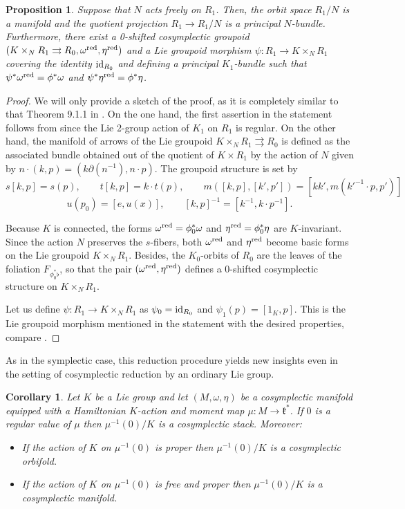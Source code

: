 \documentclass[
  a4paper, 
  reqno, 
  oneside, 
  12pt
]{amsart}
\newtheorem{proposition}[theorem]{Proposition}
\newtheorem{corollary}[theorem]{Corollary}
\theoremstyle{definition}
\theoremstyle{remark}
\newcommand{\rr}{\rightrightarrows}
\begin{document}
\begin{proposition}
Suppose that $N$ acts freely on $R_1$. Then, the orbit space $R_1/N$ is a  manifold and the quotient projection $R_1\to R_1/N$ is a principal $N$-bundle. Furthermore, there exist a 0-shifted cosymplectic groupoid $(K\times_NR_1\rr R_0,\omega^{\textnormal{red}},\eta^{\textnormal{red}})$	and a Lie groupoid morphism $\psi: R_1\to  K\times_NR_1$ covering the identity $\textnormal{id}_{R_0}$ and defining a principal $K_1$-bundle such that $\psi^\ast \omega^{\textnormal{red}}=\phi^\ast \omega$ and $\psi^\ast \eta^{\textnormal{red}}=\phi^\ast \eta$.
\end{proposition}
\begin{proof}
We will only provide a sketch of the proof, as it is completely similar to that Theorem 9.1.1 in \cite{HoffmanSjamaar}. On the one hand, the first assertion in the statement follows from \cite[Lem. 9.1.3]{HoffmanSjamaar} since the Lie 2-group action of $K_1$ on $R_1$ is regular. On the other hand, the manifold of arrows of the Lie groupoid $K\times_NR_1\rr R_0$ is defined as the associated bundle obtained out of the quotient of $K\times R_1$ by the action of $N$ given by $n\cdot (k,p)=(k\partial(n^{-1}),n\cdot p)$. The groupoid structure is set by  
$$s[k,p]=s(p),\qquad t[k,p]=k\cdot t(p),\qquad m([k,p],[k',p'])=[kk',m(k'^{-1}\cdot p,p')]$$
$$ u(p_0)=[e,u(x)], \qquad [k,p]^{-1}=[k^{-1},k\cdot p^{-1}].$$

Because $K$ is connected, the forms $\omega^{\textnormal{red}}=\phi_0^\ast \omega$ and $\eta^{\textnormal{red}}=\phi_0^\ast \eta$ are $K$-invariant. Since the action $N$ preserves the $s$-fibers, both $\omega^{\textnormal{red}}$ and $\eta^{\textnormal{red}}$ become basic forms on the Lie groupoid $K\times_N R_1$. Besides, the $K_0$-orbits of $R_0$ are the leaves of the foliation $F_{\phi_0^\ast \flat}$, so that the pair $(\omega^{\textnormal{red}},\eta^{\textnormal{red}})$ defines a 0-shifted cosymplectic structure on $K\times_N R_1$.

Let us define $\psi:R_1\to K\times_N R_1$ as $\psi_0=\textnormal{id}_{R_0}$ and $\psi_1(p)=[1_K,p]$. This is the Lie groupoid morphism mentioned in the statement with the desired properties, compare \cite[Prop. 9.1.4]{HoffmanSjamaar}.
\end{proof}

As in the symplectic case, this reduction procedure yields new insights even in the setting of cosymplectic reduction by an ordinary Lie group.

\begin{corollary}
Let $K$ be a Lie group and let $(M,\omega,\eta)$ be a cosymplectic manifold equipped with a Hamiltonian $K$-action and moment map $\mu: M\to \mathfrak{k}^\ast$. If $0$ is a regular value of $\mu$ then $\mu^{-1}(0)/K$ is a cosymplectic stack. Moreover:
\begin{itemize}
\item If the action of $K$ on $\mu^{-1}(0)$ is proper then $\mu^{-1}(0)/K$ is a cosymplectic orbifold.
\item If the action of $K$ on $\mu^{-1}(0)$ is free and proper then $\mu^{-1}(0)/K$ is a cosymplectic manifold.
\end{itemize}
\end{corollary}
\end{document}
